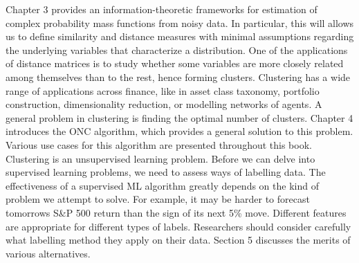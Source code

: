 \documentclass[10pt]{article}[draft]
\begin{document}
\begin{itemize}
		
		Chapter 3 provides an information-theoretic frameworks for estimation of complex probability mass functions from noisy data. In particular, this will allows us to define similarity and distance measures with minimal assumptions regarding the underlying variables that characterize a distribution. One of the applications of distance matrices is to study whether some variables are more closely related among themselves than to the rest, hence forming clusters. Clustering has a wide range of applications across finance, like in asset class taxonomy, portfolio construction, dimensionality reduction, or modelling networks of agents. A general problem in clustering is finding the optimal number of clusters. Chapter 4 introduces the ONC algorithm, which provides a general solution to this problem. Various use cases for this algorithm are presented throughout this book. Clustering is an unsupervised learning problem. Before we can delve into supervised learning problems, we need to assess ways of labelling  data. The effectiveness of a supervised ML algorithm greatly depends on the kind of problem we attempt to solve. For example, it may be harder to forecast tomorrows S\&P 500 return than the sign of its next 5\% move. Different features are appropriate for different types of labels. Researchers should consider carefully what labelling method they apply on their data. Section 5 discusses the merits of various alternatives.
		

\end{itemize}
\end{document}
